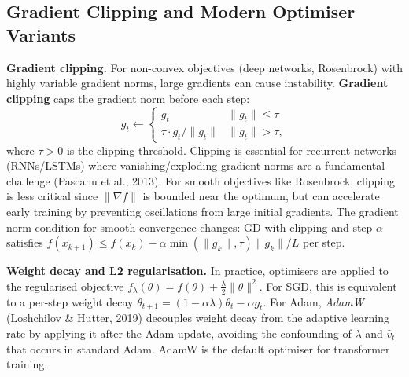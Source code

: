 \documentclass[11pt,a4paper]{article}
\theoremstyle{definition}
\begin{document}
\subsection{Gradient Clipping and Modern Optimiser Variants}

\noindent\textbf{Gradient clipping.} For non-convex objectives (deep networks, Rosenbrock) with highly variable gradient norms, large gradients can cause instability. \textbf{Gradient clipping} caps the gradient norm before each step:
\begin{equation}
g_t \leftarrow \begin{cases} g_t & \|g_t\| \leq \tau \\ \tau \cdot g_t/\|g_t\| & \|g_t\| > \tau, \end{cases}
\label{eq:grad_clip}
\end{equation}
where $\tau > 0$ is the clipping threshold. Clipping is essential for recurrent networks (RNNs/LSTMs) where vanishing/exploding gradient norms are a fundamental challenge (Pascanu et al., 2013). For smooth objectives like Rosenbrock, clipping is less critical since $\|\nabla f\|$ is bounded near the optimum, but can accelerate early training by preventing oscillations from large initial gradients. The gradient norm condition for smooth convergence changes: GD with clipping and step $\alpha$ satisfies $f(x_{k+1}) \leq f(x_k) - \alpha\min(\|g_k\|, \tau)\|g_k\|/L$ per step.

\noindent\textbf{Weight decay and L2 regularisation.} In practice, optimisers are applied to the regularised objective $f_\lambda(\theta) = f(\theta) + \frac{\lambda}{2}\|\theta\|^2$. For SGD, this is equivalent to a per-step weight decay $\theta_{t+1} = (1-\alpha\lambda)\theta_t - \alpha g_t$. For Adam, \emph{AdamW} (Loshchilov \& Hutter, 2019) decouples weight decay from the adaptive learning rate by applying it after the Adam update, avoiding the confounding of $\lambda$ and $\hat{v}_t$ that occurs in standard Adam. AdamW is the default optimiser for transformer training.
\end{document}
